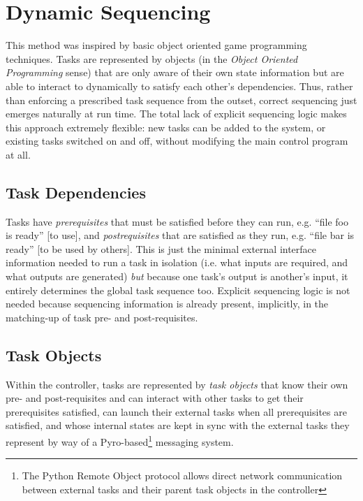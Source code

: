 \documentclass[12pt]{article}
\begin{document}
\section{Dynamic Sequencing}

This method was inspired by basic object oriented game programming
techniques. Tasks are represented by objects (in the {\em Object
Oriented Programming} sense) that are only aware of their own state
information but are able to interact to dynamically to satisfy each
other's dependencies.  Thus, rather than enforcing a prescribed task
sequence from the outset, correct sequencing just emerges naturally at
run time. The total lack of explicit sequencing logic makes this
approach extremely flexible: new tasks can be added to the system, or
existing tasks switched on and off, without modifying the main control
program at all.


\subsection{Task Dependencies}

Tasks have {\em prerequisites} that must be satisfied before they can
run, e.g. ``file foo is ready'' [to use], and {\em postrequisites} that
are satisfied as they run, e.g. ``file bar is ready'' [to be used by
others]. This is just the minimal external interface information needed
to run a task in isolation (i.e. what inputs are required, and what
outputs are generated) {\em but} because one task's output is another's
input, it entirely determines the global task sequence too. Explicit
sequencing logic is not needed because sequencing information is already
present, implicitly, in the matching-up of task pre- and
post-requisites. 

\subsection{Task Objects}

Within the controller, tasks are represented by {\em task objects} that
know their own pre- and post-requisites and can interact with other
tasks to get their prerequisites satisfied, can launch their external
tasks when all prerequisites are satisfied, and whose internal states
are kept in sync with the external tasks they represent by way of a
Pyro-based\footnote{The Python Remote Object protocol allows direct
network communication between external tasks and their parent task
objects in the controller} messaging system. 
\end{document}

